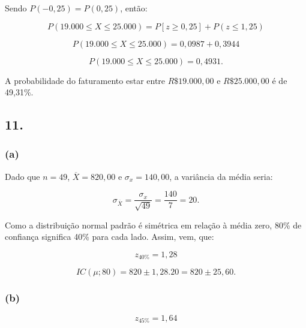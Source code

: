 \documentclass[hidelinks,11pt]{book}
\theoremstyle{definition}
\begin{document}
Sendo $P(-0,25) = P(0,25)$, então:

\vspace{2em}

\begin{displaymath}
	P( 19.000 \leq X \leq 25.000) = P[z \geq 0,25] + P(z \leq 1,25)
\end{displaymath}

\begin{displaymath}
	P( 19.000 \leq X \leq 25.000) = 0,0987 + 0,3944
\end{displaymath}

\begin{displaymath}
	P( 19.000 \leq X \leq 25.000) = 0,4931.
\end{displaymath}

A probabilidade do faturamento estar entre $R\$ 19.000,00$ e $R\$ 25.000,00$ é de 49,31\%.

	\subsection*{11.}

	\subsubsection{(a)}


		
Dado que $ n = 49$, $\overline{X} = 820,00$ e $\sigma_x = 140,00$, a variância da média seria:

\begin{displaymath}
	\sigma_{\overline{X}} = \frac{\sigma_x}{\sqrt{49}} = \frac{140}{7} = 20.
\end{displaymath}

Como a distribuição normal padrão é simétrica em relação à média zero, 80\% de confiança significa 40\% para cada lado. Assim, vem, que:

\begin{displaymath}
	z_{40\%} = 1,28
\end{displaymath}

\begin{displaymath}
	IC(\mu;80) = 820 \pm 1,28.20 = 820 \pm 25,60.
\end{displaymath}

	\subsubsection{(b)}

\begin{displaymath}
	z_{45\%} = 1,64
\end{displaymath}
\end{document}
